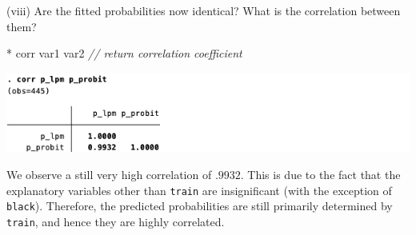 \documentclass[
  10pt,
  ignorenonframetext,
]{beamer}
\newenvironment{Shaded}{\begin{snugshade}}{\end{snugshade}}
\newcommand{\CommentTok}[1]{\textcolor[rgb]{0.56,0.35,0.01}{\textit{#1}}}
\newcommand{\FunctionTok}[1]{\textcolor[rgb]{0.00,0.00,0.00}{#1}}
\newcommand{\NormalTok}[1]{#1}
\begin{document}
\begin{frame}[fragile]{(viii) Are the fitted probabilities now
identical? What is the correlation between them?}
\protect\hypertarget{viii-are-the-fitted-probabilities-now-identical-what-is-the-correlation-between-them-1}{}
\footnotesize

\begin{Shaded}
\begin{Highlighting}[]
\NormalTok{* }\FunctionTok{corr}\NormalTok{ var1 var2 }\CommentTok{// return correlation coefficient}
\end{Highlighting}
\end{Shaded}

\begin{center}\includegraphics[width=1\linewidth]{pictures/corr2predictedvalues} \end{center}

\small

We observe a still very high correlation of \(.9932\). This is due to
the fact that the explanatory variables other than \texttt{train} are
insignificant (with the exception of \texttt{black}). Therefore, the
predicted probabilities are still primarily determined by
\texttt{train}, and hence they are highly correlated.
\end{frame}
\end{document}
